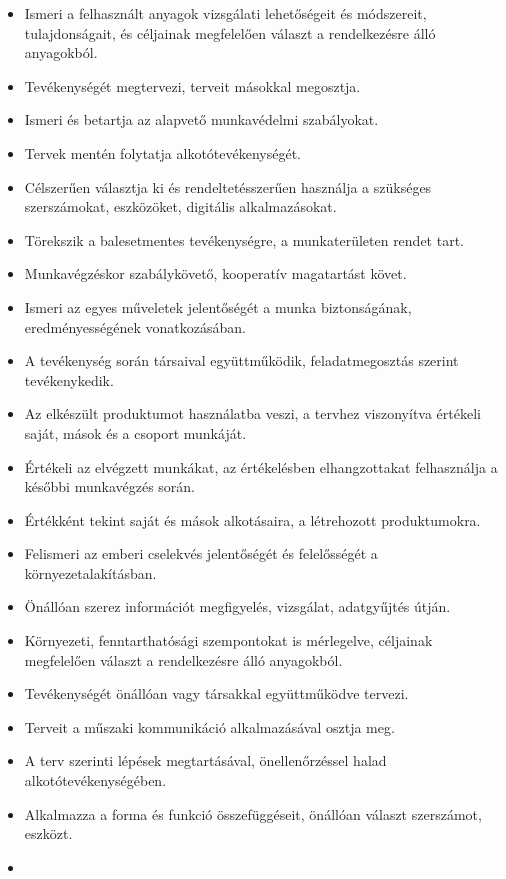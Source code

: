 \begin{itemize}
\item
  Ismeri a felhasznált anyagok vizsgálati lehetőségeit és módszereit,
  tulajdonságait, és céljainak megfelelően választ a rendelkezésre álló
  anyagokból.
\item
  Tevékenységét megtervezi, terveit másokkal megosztja.
\item
  Ismeri és betartja az alapvető munkavédelmi szabályokat.
\item
  Tervek mentén folytatja alkotótevékenységét.
\item
  Célszerűen választja ki és rendeltetésszerűen használja a szükséges
  szerszámokat, eszközöket, digitális alkalmazásokat.
\item
  Törekszik a balesetmentes tevékenységre, a munkaterületen rendet tart.
\item
  Munkavégzéskor szabálykövető, kooperatív magatartást követ.
\item
  Ismeri az egyes műveletek jelentőségét a munka biztonságának,
  eredményességének vonatkozásában.
\item
  A tevékenység során társaival együttműködik, feladatmegosztás szerint
  tevékenykedik.
\item
  Az elkészült produktumot használatba veszi, a tervhez viszonyítva
  értékeli saját, mások és a csoport munkáját.
\item
  Értékeli az elvégzett munkákat, az értékelésben elhangzottakat
  felhasználja a későbbi munkavégzés során.
\item
  Értékként tekint saját és mások alkotásaira, a létrehozott
  produktumokra.
\item
  Felismeri az emberi cselekvés jelentőségét és felelősségét a
  környezetalakításban.
\item
  Önállóan szerez információt megfigyelés, vizsgálat, adatgyűjtés útján.
\item
  Környezeti, fenntarthatósági szempontokat is mérlegelve, céljainak
  megfelelően választ a rendelkezésre álló anyagokból.
\item
  Tevékenységét önállóan vagy társakkal együttműködve tervezi.
\item
  Terveit a műszaki kommunikáció alkalmazásával osztja meg.
\item
  A terv szerinti lépések megtartásával, önellenőrzéssel halad
  alkotótevékenységében.
\item
  Alkalmazza a forma és funkció összefüggéseit, önállóan választ
  szerszámot, eszközt.
\item

\end{itemize}
